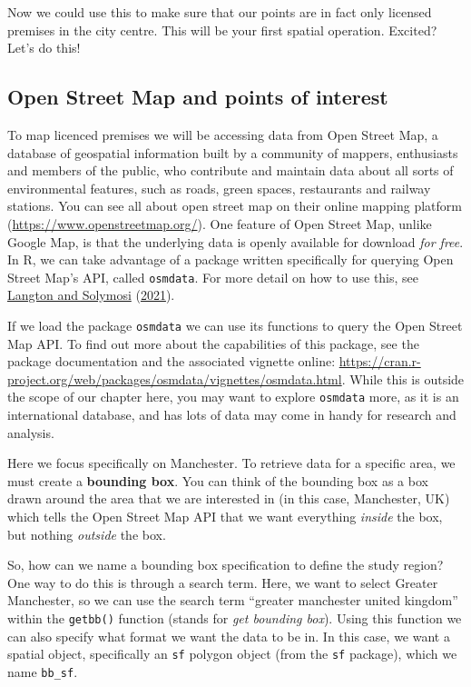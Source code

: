 \documentclass[
]{book}
\begin{document}
Now we could use this to make sure that our points are in fact only licensed premises in the city centre. This will be your first spatial operation. Excited? Let's do this!

\hypertarget{open-street-map-and-points-of-interest}{%
\subsection{Open Street Map and points of interest}\label{open-street-map-and-points-of-interest}}

To map licenced premises we will be accessing data from Open Street Map, a database of geospatial information built by a community of mappers, enthusiasts and members of the public, who contribute and maintain data about all sorts of environmental features, such as roads, green spaces, restaurants and railway stations. You can see all about open street map on their online mapping platform (\url{https://www.openstreetmap.org/}). One feature of Open Street Map, unlike Google Map, is that the underlying data is openly available for download \emph{for free}. In R, we can take advantage of a package written specifically for querying Open Street Map's API, called \texttt{osmdata}. For more detail on how to use this, see \protect\hyperlink{ref-Langton_2019}{Langton and Solymosi} (\protect\hyperlink{ref-Langton_2019}{2021}).

If we load the package \texttt{osmdata} we can use its functions to query the Open Street Map API. To find out more about the capabilities of this package, see the package documentation and the associated vignette online: \url{https://cran.r-project.org/web/packages/osmdata/vignettes/osmdata.html}. While this is outside the scope of our chapter here, you may want to explore \texttt{osmdata} more, as it is an international database, and has lots of data may come in handy for research and analysis.

Here we focus specifically on Manchester. To retrieve data for a specific area, we must create a \textbf{bounding box}. You can think of the bounding box as a box drawn around the area that we are interested in (in this case, Manchester, UK) which tells the Open Street Map API that we want everything \emph{inside} the box, but nothing \emph{outside} the box.

So, how can we name a bounding box specification to define the study region? One way to do this is through a search term. Here, we want to select Greater Manchester, so we can use the search term ``greater manchester united kingdom'' within the \texttt{getbb()} function (stands for \emph{get bounding box}). Using this function we can also specify what format we want the data to be in. In this case, we want a spatial object, specifically an \texttt{sf} polygon object (from the \texttt{sf} package), which we name \texttt{bb\_sf}.
\end{document}
